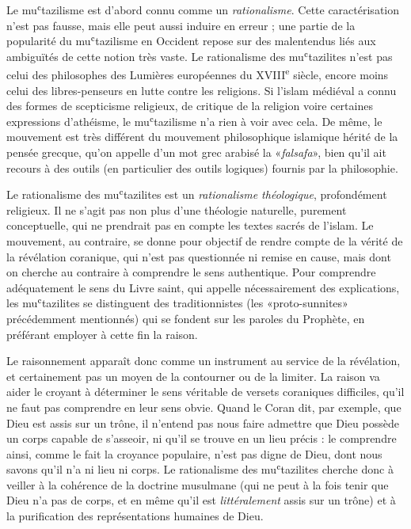 Le muʿtazilisme est d'abord connu comme un \emph{rationalisme}. Cette
caractérisation n'est pas fausse, mais elle peut aussi induire en erreur
; une partie de la popularité du muʿtazilisme en Occident repose sur des
malentendus liés aux ambiguïtés de cette notion très vaste. Le
rationalisme des muʿtazilites n'est pas celui des philosophes des
Lumières européennes du XVIII\textsuperscript{e} siècle, encore moins
celui des libres-penseurs en lutte contre les religions. Si l'islam
médiéval a connu des formes de scepticisme religieux, de critique de la
religion voire certaines expressions d'athéisme, le muʿtazilisme n'a
rien à voir avec cela. De même, le mouvement est très différent du
mouvement philosophique islamique hérité de la pensée grecque, qu'on
appelle d'un mot grec arabisé la «\emph{falsafa}», bien qu'il ait
recours à des outils (en particulier des outils logiques) fournis par la
philosophie.

Le rationalisme des muʿtazilites est un \emph{rationalisme théologique},
profondément religieux. Il ne s'agit pas non plus d'une théologie
naturelle, purement conceptuelle, qui ne prendrait pas en compte les
textes sacrés de l'islam. Le mouvement, au contraire, se donne pour
objectif de rendre compte de la vérité de la révélation coranique, qui
n'est pas questionnée ni remise en cause, mais dont on cherche au
contraire à comprendre le sens authentique. Pour comprendre adéquatement
le sens du Livre saint, qui appelle nécessairement des explications, les
muʿtazilites se distinguent des traditionnistes (les «proto-sunnites»
précédemment mentionnés) qui se fondent sur les paroles du Prophète, en
préférant employer à cette fin la raison.

Le raisonnement apparaît donc comme un instrument au service de la
révélation, et certainement pas un moyen de la contourner ou de la
limiter. La raison va aider le croyant à déterminer le sens véritable de
versets coraniques difficiles, qu'il ne faut pas comprendre en leur sens
obvie. Quand le Coran dit, par exemple, que Dieu est assis sur un trône,
il n'entend pas nous faire admettre que Dieu possède un corps capable de
s'asseoir, ni qu'il se trouve en un lieu précis : le comprendre ainsi,
comme le fait la croyance populaire, n'est pas digne de Dieu, dont nous
savons qu'il n'a ni lieu ni corps. Le rationalisme des muʿtazilites
cherche donc à veiller à la cohérence de la doctrine musulmane (qui ne
peut à la fois tenir que Dieu n'a pas de corps, et en même qu'il est
\emph{littéralement} assis sur un trône) et à la purification des
représentations humaines de Dieu.

